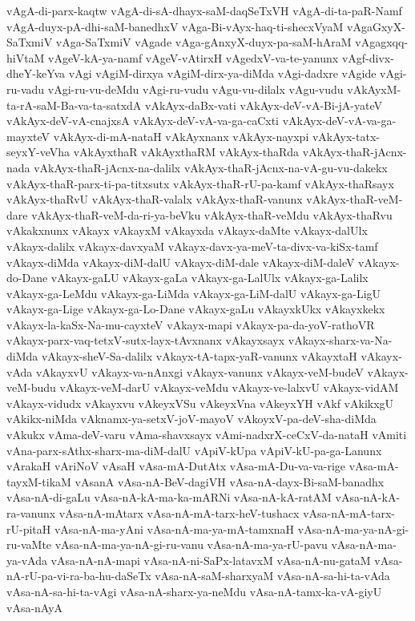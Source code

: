 {vAgA-di-parx-kaqtw
vAgA-di-sA-dhayx-saM-daqSeTxVH
vAgA-di-ta-paR-Namf
vAgA-duyx-pA-dhi-saM-banedhxV
vAga-Bi-vAyx-haq-ti-shecxVyaM
vAgaGxyX-SaTxmiV
vAga-SaTxmiV
vAgade
vAga-gAnxyX-duyx-pa-saM-hAraM
vAgagxqq-hiVtaM
vAgeV-kA-ya-namf
vAgeV-vAtirxH
vAgedxV-va-te-yanunx
vAgf-divx-dheY-keYva
vAgi
vAgiM-dirxya
vAgiM-dirx-ya-diMda
vAgi-dadxre
vAgide
vAgi-ru-vadu
vAgi-ru-vu-deMdu
vAgi-ru-vudu
vAgu-vu-dilalx
vAgu-vudu
vAkAyxM-ta-rA-saM-Ba-va-ta-satxdA
vAkAyx-daBx-vati
vAkAyx-deV-vA-Bi-jA-yateV
vAkAyx-deV-vA-cnajxsA
vAkAyx-deV-vA-va-ga-caCxti
vAkAyx-deV-vA-va-ga-mayxteV
vAkAyx-di-mA-nataH
vAkAyxnanx
vAkAyx-nayxpi
vAkAyx-tatx-seyxY-veVha
vAkAyxthaR
vAkAyxthaRM
vAkAyx-thaRda
vAkAyx-thaR-jAcnx-nada
vAkAyx-thaR-jAcnx-na-dalilx
vAkAyx-thaR-jAcnx-na-vA-gu-vu-dakekx
vAkAyx-thaR-parx-ti-pa-titxsutx
vAkAyx-thaR-rU-pa-kamf
vAkAyx-thaRsayx
vAkAyx-thaRvU
vAkAyx-thaR-valalx
vAkAyx-thaR-vanunx
vAkAyx-thaR-veM-dare
vAkAyx-thaR-veM-da-ri-ya-beVku
vAkAyx-thaR-veMdu
vAkAyx-thaRvu
vAkakxnunx
vAkayx
vAkayxM
vAkayxda
vAkayx-daMte
vAkayx-dalUlx
vAkayx-dalilx
vAkayx-davxyaM
vAkayx-davx-ya-meV-ta-divx-va-kiSx-tamf
vAkayx-diMda
vAkayx-diM-dalU
vAkayx-diM-dale
vAkayx-diM-daleV
vAkayx-do-Dane
vAkayx-gaLU
vAkayx-gaLa
vAkayx-ga-LalUlx
vAkayx-ga-Lalilx
vAkayx-ga-LeMdu
vAkayx-ga-LiMda
vAkayx-ga-LiM-dalU
vAkayx-ga-LigU
vAkayx-ga-Lige
vAkayx-ga-Lo-Dane
vAkayx-gaLu
vAkayxkUkx
vAkayxkekx
vAkayx-la-kaSx-Na-mu-cayxteV
vAkayx-mapi
vAkayx-pa-da-yoV-rathoVR
vAkayx-parx-vaq-tetxV-sutx-layx-tAvxnanx
vAkayxsayx
vAkayx-sharx-va-Na-diMda
vAkayx-sheV-Sa-dalilx
vAkayx-tA-tapx-yaR-vanunx
vAkayxtaH
vAkayx-vAda
vAkayxvU
vAkayx-va-nAnxgi
vAkayx-vanunx
vAkayx-veM-budeV
vAkayx-veM-budu
vAkayx-veM-darU
vAkayx-veMdu
vAkayx-ve-lalxvU
vAkayx-vidAM
vAkayx-vidudx
vAkayxvu
vAkeyxVSu
vAkeyxVna
vAkeyxYH
vAkf
vAkikxgU
vAkikx-niMda
vAknamx-ya-setxV-joV-mayoV
vAkoyxV-pa-deV-sha-diMda
vAkukx
vAma-deV-varu
vAma-shavxsayx
vAmi-nadxrX-ceCxV-da-nataH
vAmiti
vAna-parx-sAthx-sharx-ma-diM-dalU
vApiV-kUpa
vApiV-kU-pa-ga-Lanunx
vArakaH
vAriNoV
vAsaH
vAsa-mA-DutAtx
vAsa-mA-Du-va-va-rige
vAsa-mA-tayxM-tikaM
vAsanA
vAsa-nA-BeV-dagiVH
vAsa-nA-dayx-Bi-saM-banadhx
vAsa-nA-di-gaLu
vAsa-nA-kA-ma-ka-mARNi
vAsa-nA-kA-ratAM
vAsa-nA-kA-ra-vanunx
vAsa-nA-mAtarx
vAsa-nA-mA-tarx-heV-tushacx
vAsa-nA-mA-tarx-rU-pitaH
vAsa-nA-ma-yAni
vAsa-nA-ma-ya-mA-tamxnaH
vAsa-nA-ma-ya-nA-gi-ru-vaMte
vAsa-nA-ma-ya-nA-gi-ru-vanu
vAsa-nA-ma-ya-rU-pavu
vAsa-nA-ma-ya-vAda
vAsa-nA-nA-mapi
vAsa-nA-ni-SaPx-latavxM
vAsa-nA-nu-gataM
vAsa-nA-rU-pa-vi-ra-ba-hu-daSeTx
vAsa-nA-saM-sharxyaM
vAsa-nA-sa-hi-ta-vAda
vAsa-nA-sa-hi-ta-vAgi
vAsa-nA-sharx-ya-neMdu
vAsa-nA-tamx-ka-vA-giyU
vAsa-nAyA
}
